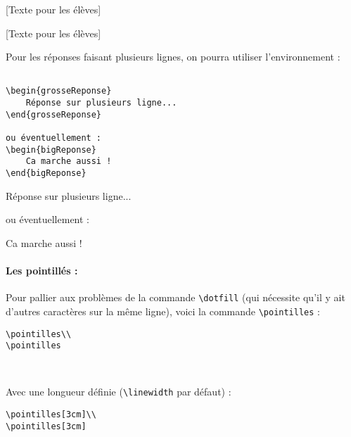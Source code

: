 \documentclass[a4paper,10pt]{article}
\begin{document}

[Texte pour les élèves]

[Texte pour les élèves]


\vspace{1cm}Pour les réponses faisant plusieurs lignes, on pourra utiliser l'environnement :
		\begin{verbatim}

\begin{grosseReponse}
	Réponse sur plusieurs ligne...
\end{grosseReponse}

ou éventuellement :
\begin{bigReponse}
	Ca marche aussi !
\end{bigReponse}
		\end{verbatim}
		
\begin{grosseReponse}
	Réponse sur plusieurs ligne...
\end{grosseReponse}

ou éventuellement :
\begin{bigReponse}
	Ca marche aussi !
\end{bigReponse}

	\paragraph{Les pointillés :}
	
	Pour pallier aux problèmes de la commande \verb!\dotfill! (qui nécessite qu'il y ait d'autres caractères sur la même ligne), voici la commande \verb!\pointilles! :
	\begin{verbatim}
\pointilles\\
\pointilles
	\end{verbatim}
	

\noindent\pointilles\\
\pointilles

	\vspace{0.5cm}Avec une longueur définie (\verb!\linewidth! par défaut) :
	\begin{verbatim}
\pointilles[3cm]\\
\pointilles[3cm]
	\end{verbatim}
	
\end{document}

